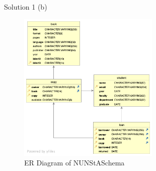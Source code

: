 \begin{frame}[fragile]{Solution 1 (b)}
\begin{figure}
\includegraphics[width=0.6\textwidth]{t1/images/t1-0.png}
\caption{ER Diagram of NUNStASchema}
\end{figure}
\end{frame}

